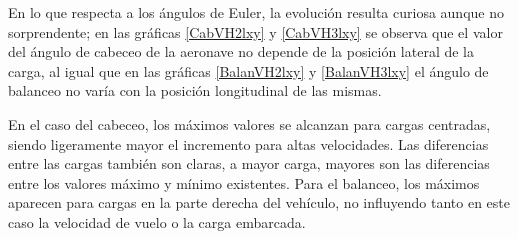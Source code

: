 En lo que respecta a los ángulos de Euler, la evolución resulta curiosa aunque no sorprendente; en las gráficas \ref{CabVH2lxy} y \ref{CabVH3lxy} se observa que el valor del ángulo de cabeceo de la aeronave no depende de la posición lateral de la carga, al igual que en las gráficas \ref{BalanVH2lxy} y \ref{BalanVH3lxy} el ángulo de balanceo no varía con la posición longitudinal de las mismas.

En el caso del cabeceo, los máximos valores se alcanzan para cargas centradas, siendo ligeramente mayor el incremento para altas velocidades. Las diferencias entre las cargas también son claras, a mayor carga, mayores son las diferencias entre los valores máximo y mínimo existentes. Para el balanceo, los máximos aparecen para cargas en la parte derecha del vehículo, no influyendo tanto en este caso la velocidad de vuelo o la carga embarcada.

